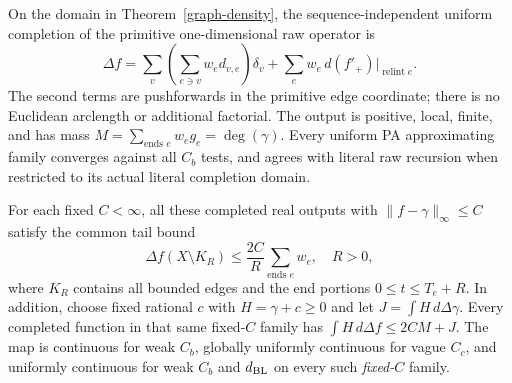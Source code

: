 \begin{theorem}\label{graph-operator}
On the domain in Theorem~\ref{graph-density}, the sequence-independent
uniform completion of the primitive one-dimensional raw operator is
\[
 \Delta f=\sum_v\left(\sum_{e\ni v}w_ed_{v,e}\right)\delta_v
          +\sum_e w_e\,d(f'_+)\big|_{\operatorname{relint}e}.
\]
The second terms are pushforwards in the primitive edge coordinate;
there is no Euclidean arclength or additional factorial. The output is
positive, local, finite, and has mass $M=\sum_{\text{ends }e}w_eg_e
=\deg(\gamma)$. Every uniform PA approximating family converges against
all $C_b$ tests, and agrees with literal raw recursion when restricted
to its actual literal completion domain.

For each fixed $C<\infty$, all these completed real outputs with
$\|f-\gamma\|_\infty\leq C$ satisfy the common tail bound
\[
 \Delta f(X\setminus K_R)\leq\frac{2C}{R}\sum_{\text{ends }e}w_e,
 \quad R>0,
\]
where $K_R$ contains all bounded edges and the end portions
$0\leq t\leq T_e+R$. In addition, choose fixed rational $c$ with
$H=\gamma+c\geq0$ and let $J=\int H\,d\Delta\gamma$. Every completed
function in that same fixed-$C$ family has
$\int H\,d\Delta f\leq2CM+J$. The map is continuous for weak $C_b$, globally
uniformly continuous for vague $C_c$, and uniformly continuous for
weak $C_b$ and $d_{\rm BL}$ on every such \emph{fixed-$C$} family.
\end{theorem}
